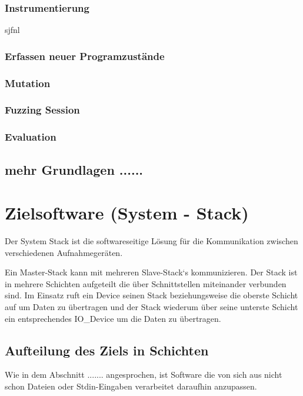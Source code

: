 \documentclass[12pt,a4paper]{scrreprt}
\begin{document}
\newpage
\subsection{Instrumentierung}	
sjfnl

\subsection{Erfassen neuer Programzustände}

\subsection{Mutation}

\subsection{Fuzzing Session}

\subsection{Evaluation}

\section{mehr Grundlagen ......}


\newpage
\chapter{Zielsoftware (System - Stack)}
Der System Stack ist die softwareseitige Lösung für die Kommunikation zwischen verschiedenen Aufnahmegeräten.

Ein Master-Stack kann mit mehreren Slave-Stack`s kommunizieren. Der Stack ist in mehrere Schichten aufgeteilt die über Schnittstellen miteinander verbunden sind. Im Einsatz ruft ein Device seinen Stack beziehungsweise die oberste Schicht auf um Daten zu übertragen und der Stack wiederum über seine unterste Schicht ein entsprechendes IO\_Device um die Daten zu übertragen.


\section{Aufteilung des Ziels in Schichten}

Wie in dem Abschnitt ....... angesprochen, ist Software die von sich aus nicht schon Dateien oder Stdin-Eingaben verarbeitet daraufhin anzupassen.
\end{document}
